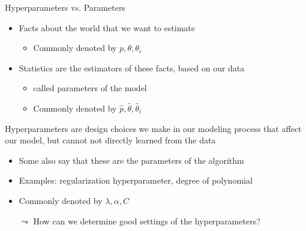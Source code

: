\documentclass[aspectratio=169]{../latex_main/tntbeamer}  %
\begin{document}
	
	\begin{frame}{Hyperparameters vs. Parameters}
        \begin{itemize}
            \item Facts about the world that we want to estimate
            \begin{itemize}
                \item Commonly denoted by $p, \theta, \theta_i$
            \end{itemize}
            \item Statistics are the estimators of these facts, based on our data
            \begin{itemize}
                \item called \alert{parameters of the model}
                \item Commonly denoted by $\hat{p}, \hat{\theta}, \hat{\theta}_i$
            \end{itemize}
        \end{itemize}
        \bigskip
        \alert{Hyperparameters} are design choices we make in our modeling process that affect our model, but cannot not directly learned from the data

        \begin{itemize}
            \item Some also say that these are the \alert{parameters of the algorithm} 
            \item Examples: regularization hyperparameter, degree of polynomial
            \item Commonly denoted by $\lambda, \alpha, C$
            \item[$\leadsto$] How can we determine good settings of the hyperparameters?
        \end{itemize}
        
	\end{frame}
\end{document}
